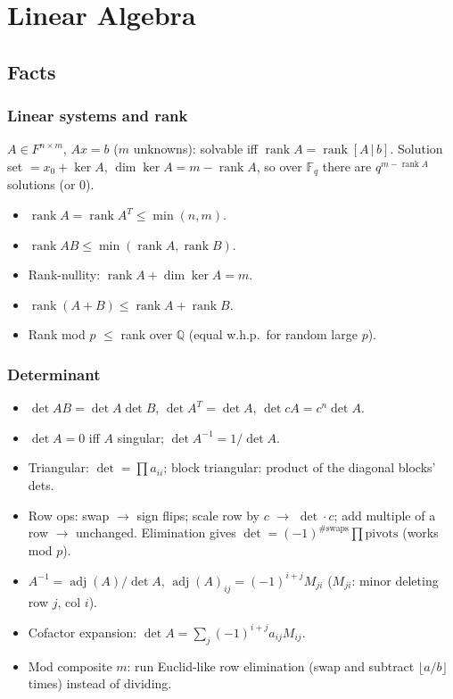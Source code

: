 \chapter{Linear Algebra}

\section{Facts}

\subsection{Linear systems and rank}
$A\in F^{n\times m}$, $Ax=b$ ($m$ unknowns): solvable iff
$\operatorname{rank}A=\operatorname{rank}[A\,|\,b]$.
Solution set $=x_0+\ker A$, $\dim\ker A=m-\operatorname{rank}A$,
so over $\mathbb{F}_q$ there are $q^{m-\operatorname{rank}A}$ solutions (or $0$).
\begin{itemize}
\item $\operatorname{rank}A=\operatorname{rank}A^T\le\min(n,m)$.
\item $\operatorname{rank}AB\le\min(\operatorname{rank}A,\operatorname{rank}B)$.
\item Rank-nullity: $\operatorname{rank}A+\dim\ker A=m$.
\item $\operatorname{rank}(A+B)\le\operatorname{rank}A+\operatorname{rank}B$.
\item Rank mod $p$ $\le$ rank over $\mathbb{Q}$ (equal w.h.p.\ for random large $p$).
\end{itemize}

\subsection{Determinant}
\begin{itemize}
\item $\det AB=\det A\det B$, $\det A^T=\det A$, $\det cA=c^n\det A$.
\item $\det A=0$ iff $A$ singular; $\det A^{-1}=1/\det A$.
\item Triangular: $\det=\prod a_{ii}$; block triangular: product of the diagonal blocks' dets.
\item Row ops: swap $\to$ sign flips; scale row by $c$ $\to$ $\det\cdot c$;
add multiple of a row $\to$ unchanged. Elimination gives
$\det=(-1)^{\#\text{swaps}}\prod\text{pivots}$ (works mod $p$).
\item $A^{-1}=\operatorname{adj}(A)/\det A$,
$\operatorname{adj}(A)_{ij}=(-1)^{i+j}M_{ji}$ ($M_{ji}$: minor
deleting row $j$, col $i$).
\item Cofactor expansion: $\det A=\sum_j(-1)^{i+j}a_{ij}M_{ij}$.
\item Mod composite $m$: run Euclid-like row elimination (swap and
subtract $\lfloor a/b\rfloor$ times) instead of dividing.
\end{itemize}

